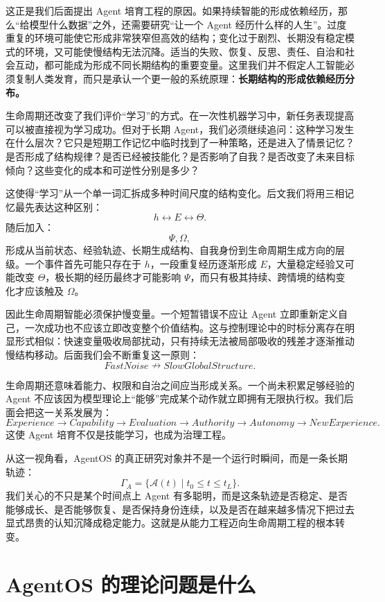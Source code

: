 这正是我们后面提出 Agent 培育工程的原因。如果持续智能的形成依赖经历，那么“给模型什么数据”之外，还需要研究“让一个 Agent 经历什么样的人生”。过度重复的环境可能使它形成非常狭窄但高效的结构；变化过于剧烈、长期没有稳定模式的环境，又可能使慢结构无法沉降。适当的失败、恢复、反思、责任、自治和社会互动，都可能成为形成不同长期结构的重要变量。这里我们并不假定人工智能必须复制人类发育，而只是承认一个更一般的系统原理：\textbf{长期结构的形成依赖经历分布。}

生命周期还改变了我们评价“学习”的方式。在一次性机器学习中，新任务表现提高可以被直接视为学习成功。但对于长期 Agent，我们必须继续追问：这种学习发生在什么层次？它只是短期工作记忆中临时找到了一种策略，还是进入了情景记忆？是否形成了结构规律？是否已经被技能化？是否影响了自我？是否改变了未来目标倾向？这些变化的成本和可逆性分别是多少？

这使得“学习”从一个单一词汇拆成多种时间尺度的结构变化。后文我们将用三相记忆最先表达这种区别：
\[
h
\leftrightarrow
E
\leftrightarrow
\Theta.
\]
随后加入：
\[
\Psi,\Omega,
\]
形成从当前状态、经验轨迹、长期生成结构、自我身份到生命周期生成方向的层级。一个事件首先可能只存在于 $h$，一段重复经历逐渐形成 $E$，大量稳定经验又可能改变 $\Theta$，极长期的经历最终才可能影响 $\Psi$，而只有极其持续、跨情境的结构变化才应该触及 $\Omega$。

因此生命周期智能必须保护慢变量。一个短暂错误不应让 Agent 立即重新定义自己，一次成功也不应该立即改变整个价值结构。这与控制理论中的时标分离存在明显形式相似：快速变量吸收局部扰动，只有持续无法被局部吸收的残差才逐渐推动慢结构移动。后面我们会不断重复这一原则：
\[
FastNoise
\nrightarrow
SlowGlobalStructure.
\]

生命周期还意味着能力、权限和自治之间应当形成关系。一个尚未积累足够经验的 Agent 不应该因为模型理论上“能够”完成某个动作就立即拥有无限执行权。我们后面会把这一关系发展为：
\[
Experience
\rightarrow
Capability
\rightarrow
Evaluation
\rightarrow
Authority
\rightarrow
Autonomy
\rightarrow
NewExperience.
\]
这使 Agent 培育不仅是技能学习，也成为治理工程。

从这一视角看，AgentOS 的真正研究对象并不是一个运行时瞬间，而是一条长期轨迹：
\[
\Gamma_A
=
\{\mathcal{A}(t)\mid t_0\le t\le t_L\}.
\]
我们关心的不只是某个时间点上 Agent 有多聪明，而是这条轨迹是否稳定、是否能够成长、是否能够恢复、是否保持身份连续，以及是否在越来越多情况下把过去显式昂贵的认知沉降成稳定能力。这就是从能力工程迈向生命周期工程的根本转变。

\section{AgentOS 的理论问题是什么}

